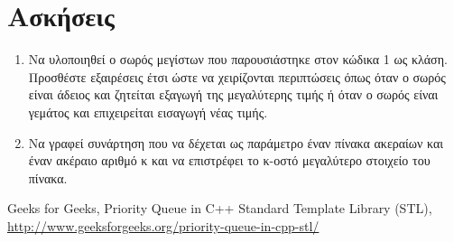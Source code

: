 \section{Ασκήσεις}
\begin{enumerate}
\item Να υλοποιηθεί ο σωρός μεγίστων που παρουσιάστηκε στον κώδικα 1 ως κλάση. Προσθέστε εξαιρέσεις έτσι ώστε να χειρίζονται περιπτώσεις όπως όταν ο σωρός είναι άδειος και ζητείται εξαγωγή της μεγαλύτερης τιμής ή όταν ο σωρός είναι γεμάτος και επιχειρείται εισαγωγή νέας τιμής.
\item Να γραφεί συνάρτηση που να δέχεται ως παράμετρο έναν πίνακα ακεραίων και έναν ακέραιο αριθμό κ και να επιστρέφει το κ-οστό μεγαλύτερο στοιχείο του πίνακα. 
\end{enumerate}

\begin{thebibliography}{9}
Geeks for Geeks, Priority Queue in C++ Standard Template Library (STL), \href{http://www.geeksforgeeks.org/priority-queue-in-cpp-stl/}{http://www.geeksforgeeks.org/priority-queue-in-cpp-stl/}
\end{thebibliography}

